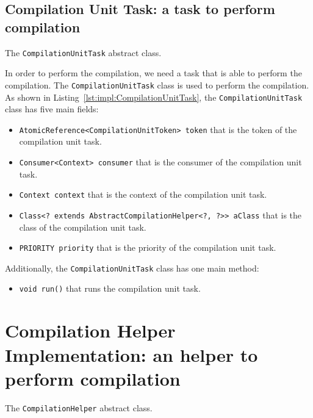 \subsection{Compilation Unit Task: a task to perform compilation}\label{subsec:impl:CompilationUnitTask}

\begin{Listing}[tbh]
    \centering
    \caption{The \texttt{CompilationUnitTask} abstract class.}
    \label{lst:impl:CompilationUnitTask}
\end{Listing}

In order to perform the compilation, we need a task that is able to perform the compilation. The \texttt{CompilationUnitTask} class is used to perform the compilation. As shown in Listing~\ref{lst:impl:CompilationUnitTask}, the \texttt{CompilationUnitTask} class has five main fields:
\begin{itemize}
    \item \texttt{AtomicReference<CompilationUnitToken> token} that is the token of the compilation unit task.
    \item \texttt{Consumer<Context> consumer} that is the consumer of the compilation unit task.
    \item \texttt{Context context} that is the context of the compilation unit task.
    \item \texttt{Class<? extends AbstractCompilationHelper<?, ?>> aClass} that is the class of the compilation unit task.
    \item \texttt{PRIORITY priority} that is the priority of the compilation unit task.
\end{itemize}

Additionally, the \texttt{CompilationUnitTask} class has one main method:
\begin{itemize}
    \item \texttt{void run()} that runs the compilation unit task.
\end{itemize}

\section{Compilation Helper Implementation: an helper to perform compilation}\label{subsec:impl:CompilationHelper}


\begin{Listing}[tbh]
    \centering
    \caption{The \texttt{CompilationHelper} abstract class.}
    \label{lst:impl:CompilationHelper}
\end{Listing}

